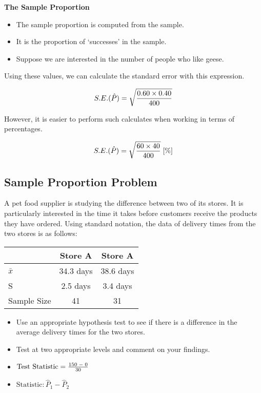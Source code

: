 \documentclass[]{report}
\begin{document}
\begin{enumerate}[(i)]
{		\noindent \textbf{The Sample Proportion}
		\begin{itemize}
			\item The sample proportion is computed from the sample.
			\item It is the proportion of `successes' in the sample.
			\item Suppose we are interested in the number of people who like geese.
		\end{itemize}
		
		
		Using these values, we can calculate the standard error with this expression.
		
		\[
		S.E. (\hat{P}) = \sqrt{ { 0.60 \times 0.40 \over 400}}
		\]
		
		\vspace{0.1cm}
		
		However, it is easier to perform such calculates when working in terms of percentages.
		
		\vspace{0.1cm}
		\[
		S.E. (\hat{P}) = \sqrt{ { 60 \times 40 \over 400}}  \;[\%]
		\]
\subsection{Sample Proportion Problem}
		A pet food supplier is studying the difference between two of its stores. It is
		particularly interested in the time it takes before customers receive the products
		they have ordered. Using standard notation, the data of delivery times from
		the two stores is as follows:
		\begin{tabular}{|l|c|c|}
			\hline
			& Store A  & Store A  \\ \hline 
			$\bar{x}$ & 34.3 days & 38.6 days \\ \hline
			S & 2.5 days & 3.4 days \\ \hline 
			Sample Size & 41 & 31 \\ \hline
			\hline
		\end{tabular}
		
		\begin{itemize}
			\item Use an appropriate hypothesis test to see if there is a difference in the
			average delivery times for the two stores. \item Test at two appropriate levels
			and comment on your findings. \end{itemize}

		
		\begin{itemize}
			\item $\mbox{Test Statistic}= { 150\; - \;0 \over 30 }$\\
			\item $\mbox{Statistic} : \hat{P}_{1} - \hat{P}_{2}$\\
		\end{itemize}
		
}
\end{enumerate}
\end{document}
